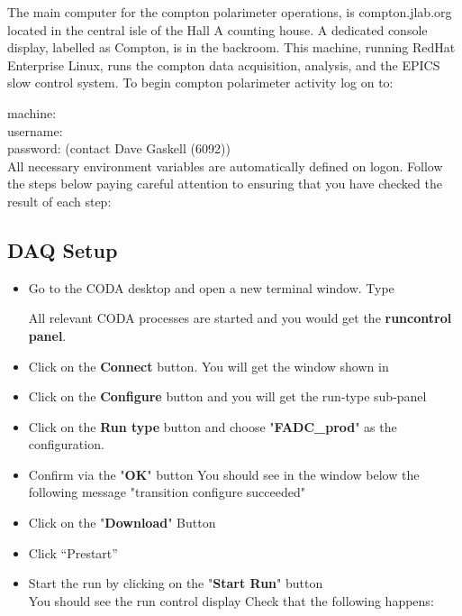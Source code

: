 {The main  computer for the compton polarimeter operations, is compton.jlab.org located
in the central isle of the Hall A counting house. A dedicated console display, labelled as Compton,
is in the backroom. This machine, running RedHat Enterprise Linux, runs the compton data acquisition,
analysis, and the EPICS~\cite{EPICSwww} slow control system. To begin compton polarimeter activity log on to:


\noindent machine:  \\
username: \\
password: \mycomp{*******}(contact Dave Gaskell (6092))\\

All necessary environment variables are automatically defined on logon. Follow the steps below
paying careful attention to ensuring that you have checked the result of each step:


\subsection{DAQ Setup}

\begin{itemize}
\item Go to the CODA desktop and open a new terminal window. Type


All relevant CODA processes are started and you would get the {\bf runcontrol panel}. 

\item Click on the {\bf Connect} button. You will get the  window shown in
\item Click on the {\bf Configure} button and you will get the run-type sub-panel 
\item Click on the {\bf Run type} button and choose "{\bf FADC\_prod}" as the  configuration.

\item Confirm via the "{\bf OK}" button
You should see in the window below the following message "transition
configure succeeded"
\item Click on the "{\bf Download}" Button
\item Click ``Prestart''
\item Start the run by clicking on the "{\bf Start Run}" button\\
You should see the run control display
Check that the following happens:\\


\end{itemize}}
